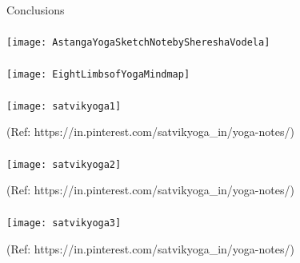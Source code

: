 \begin{frame}[fragile]\frametitle{}
\begin{center}
{\Large Conclusions}
\end{center}
\end{frame}

\begin{frame}[fragile]\frametitle{}

\begin{center}
\texttt{[image: AstangaYogaSketchNotebyShereshaVodela]}
\end{center}

\end{frame}

\begin{frame}[fragile]\frametitle{}

\begin{center}
\texttt{[image: EightLimbsofYogaMindmap]}
\end{center}

\end{frame}

\begin{frame}[fragile]\frametitle{}

\begin{center}
\texttt{[image: satvikyoga1]}

{\tiny (Ref: https://in.pinterest.com/satvikyoga\_in/yoga-notes/)}
\end{center}

\end{frame}

\begin{frame}[fragile]\frametitle{}

\begin{center}
\texttt{[image: satvikyoga2]}

{\tiny (Ref: https://in.pinterest.com/satvikyoga\_in/yoga-notes/)}
\end{center}

\end{frame}


\begin{frame}[fragile]\frametitle{}

\begin{center}
\texttt{[image: satvikyoga3]}

{\tiny (Ref: https://in.pinterest.com/satvikyoga\_in/yoga-notes/)}
\end{center}

\end{frame}

